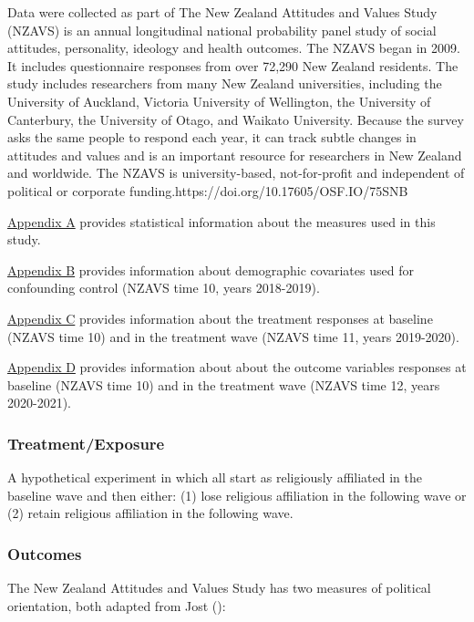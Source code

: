 \documentclass[
  singlecolumn]{article}
\begin{document}
Data were collected as part of The New Zealand Attitudes and Values
Study (NZAVS) is an annual longitudinal national probability panel study
of social attitudes, personality, ideology and health outcomes. The
NZAVS began in 2009. It includes questionnaire responses from over
72,290 New Zealand residents. The study includes researchers from many
New Zealand universities, including the University of Auckland, Victoria
University of Wellington, the University of Canterbury, the University
of Otago, and Waikato University. Because the survey asks the same
people to respond each year, it can track subtle changes in attitudes
and values and is an important resource for researchers in New Zealand
and worldwide. The NZAVS is university-based, not-for-profit and
independent of political or corporate
funding.https://doi.org/10.17605/OSF.IO/75SNB

\hyperref[appendix-measures]{Appendix A} provides statistical
information about the measures used in this study.

\hyperref[appendix-demographics]{Appendix B} provides information about
demographic covariates used for confounding control (NZAVS time 10,
years 2018-2019).

\hyperref[appendix-exposures]{Appendix C} provides information about the
treatment responses at baseline (NZAVS time 10) and in the treatment
wave (NZAVS time 11, years 2019-2020).

\hyperref[appendix-outcomes]{Appendix D} provides information about
about the outcome variables responses at baseline (NZAVS time 10) and in
the treatment wave (NZAVS time 12, years 2020-2021).

\subsubsection{Treatment/Exposure}\label{treatmentexposure}

A hypothetical experiment in which all start as religiously affiliated
in the baseline wave and then either: (1) lose religious affiliation in
the following wave or (2) retain religious affiliation in the following
wave.

\subsubsection{Outcomes}\label{outcomes}

The New Zealand Attitudes and Values Study has two measures of political
orientation, both adapted from Jost
():
\end{document}
